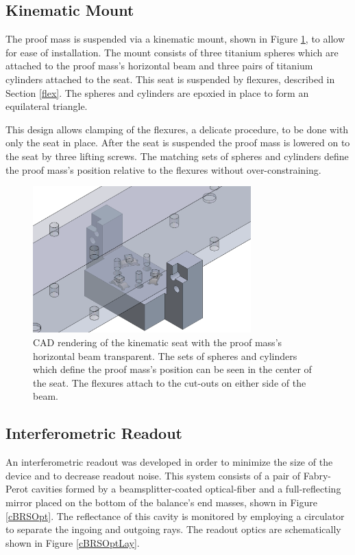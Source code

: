 \documentclass [12pt, proquest]{uwthesis}[2019]
\begin{document}
\subsection{Kinematic Mount}

The proof mass is suspended via a kinematic mount, shown in Figure \ref{kmount}, to allow for ease of installation. The mount consists of three titanium spheres which are attached to the proof mass's horizontal beam and three pairs of titanium cylinders attached to the seat. This seat is suspended by flexures, described in Section \ref{flex}. The spheres and cylinders are epoxied in place to form an equilateral triangle.

This design allows clamping of the flexures, a delicate procedure, to be done with only the seat in place. After the seat is suspended the proof mass is lowered on to the seat by three lifting screws. The matching sets of spheres and cylinders define the proof mass's position relative to the flexures without over-constraining.

\begin{figure}[!h]
\begin{center}
\includegraphics[width=0.75\textwidth]{cBRSKMount.png}
\end{center}
\caption[CAD rendering of the cBRS kinematic mount]{CAD rendering of the kinematic seat with the proof mass's horizontal beam transparent. The sets of spheres and cylinders which define the proof mass's position can be seen in the center of the seat. The flexures attach to the cut-outs on either side of the beam.}\label{kmount}
\end{figure}

\subsection{Interferometric Readout}
An interferometric readout was developed in order to minimize the size of the device and to decrease readout noise. This system consists of a pair of Fabry-Perot cavities formed by a beamsplitter-coated optical-fiber and a full-reflecting mirror placed on the bottom of the balance's end masses, shown in Figure \ref{cBRSOpt}. The reflectance of this cavity is monitored by employing a circulator to separate the ingoing and outgoing rays. The readout optics are schematically shown in Figure \ref{cBRSOptLay}. 
\end{document}
